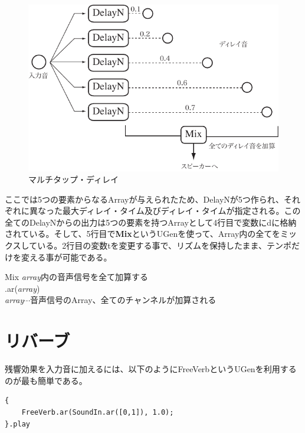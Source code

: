 \documentclass{jsarticle}
\begin{document}
\begin{figure}[htbp]
	\begin{center}
		\includegraphics[scale=0.7]{multitap.pdf}
	\end{center}
	\caption{マルチタップ・ディレイ}
	\label{fig:multitap}
\end{figure}

ここでは5つの要素からなるArrayが与えられたため、DelayNが5つ作られ、それぞれに異なった最大ディレイ・タイム及びディレイ・タイムが指定される。この全てのDelayNからの出力は5つの要素を持つArrayとして4行目で変数にdに格納されている。そして、5行目で{\bf Mix}というUGenを使って、Array内の全てをミックスしている。2行目の変数tを変更する事で、リズムを保持したまま、テンポだけを変える事が可能である。


\begin{itembox}[l]{Mix}
{\footnotesize 
{\it array}内の音声信号を全て加算する\\
.ar({\it array})\\
{\it array}$\cdots$音声信号のArray、全てのチャンネルが加算される\\
}
\end{itembox}

\section{リバーブ}
残響効果を入力音に加えるには、以下のようにFreeVerbというUGenを利用するのが最も簡単である。

\begin{lstlisting}[caption=リバーブ, label=code:reverb]
{
	FreeVerb.ar(SoundIn.ar([0,1]), 1.0);
}.play
\end{lstlisting}
\end{document}

